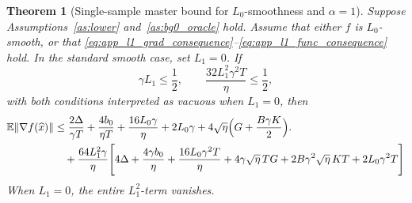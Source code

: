 \documentclass[letter,11pt]{article}
\newtheorem{theorem}{Theorem}[]
\newcommand{\E}{\mathbb{E}}
\begin{document}
\begin{theorem}[Single-sample master bound for \(L_0\)-smoothness and \(\alpha=1\)]
\label{thm:app_nsgdm_l1_master}
Suppose Assumptions~\ref{as:lower} and~\ref{as:bg0_oracle} hold. Assume
that either \(f\) is \(L_0\)-smooth, or that
\eqref{eq:app_l1_grad_consequence}--\eqref{eq:app_l1_func_consequence} hold.
In the standard smooth case, set \(L_1=0\). If
\begin{equation}
\label{eq:app_l1_master_conditions}
    \gamma L_1\le \frac12,
    \qquad
    \frac{32L_1^2\gamma^2T}{\eta}\le\frac12,
\end{equation}
with both conditions interpreted as vacuous when \(L_1=0\), then
\begin{align}
\E\|\nabla f(\widehat x)\|
&\le
\frac{2\Delta}{\gamma T}
+\frac{4b_0}{\eta T}
+\frac{16L_0\gamma}{\eta}
+2L_0\gamma +4\sqrt{\eta}
\Big(G+\frac{B\gamma K}{2}\Big).
\notag\\
&
\quad
+\frac{64L_1^2\gamma}{\eta}
\Bigg[
4\Delta
+\frac{4\gamma b_0}{\eta}
+\frac{16L_0\gamma^2T}{\eta}
+4\gamma\sqrt{\eta}\,TG
+2B\gamma^2\sqrt{\eta}\,KT
+2L_0\gamma^2T
\Bigg]
\label{eq:app_l1_master_bound}
\end{align}
When \(L_1=0\), the entire \(L_1^2\)-term vanishes.
\end{theorem}
\end{document}
